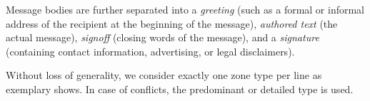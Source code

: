 \documentclass{llncs}
\begin{document}
Message bodies are further separated into a \textit{greeting} (such as a formal or informal address of the recipient at the beginning of the message), \textit{authored text} (the actual message), \textit{signoff} (closing words of the message), and a \textit{signature} (containing contact information, advertising, or legal disclaimers).

Without loss of generality, we consider exactly one zone type per line as  exemplary shows.
In case of conflicts, the predominant or detailed type is used.


\end{document}
